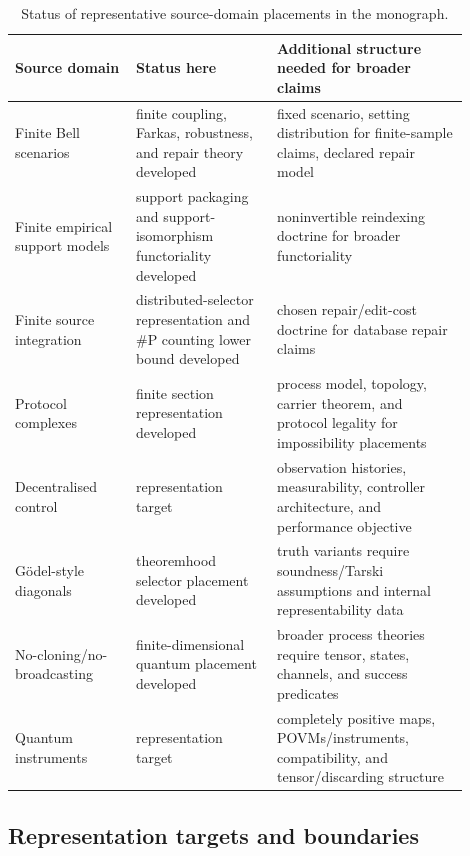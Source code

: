 \documentclass[11pt]{article}
\theoremstyle{plain}
\theoremstyle{definition}
\theoremstyle{remark}
\begin{document}
\begin{table}[htbp]
\centering
\caption{Status of representative source-domain placements in the monograph.}
\label{tab:source-domain-status}
\begin{tabular}{@{}p{0.24\linewidth}p{0.28\linewidth}p{0.38\linewidth}@{}}
\toprule
Source domain & Status here & Additional structure needed for broader claims\\
\midrule
Finite Bell scenarios & finite coupling, Farkas, robustness, and repair theory developed & fixed scenario, setting distribution for finite-sample claims, declared repair model\\
Finite empirical support models & support packaging and support-isomorphism functoriality developed & noninvertible reindexing doctrine for broader functoriality\\
Finite source integration & distributed-selector representation and $\#\mathrm P$ counting lower bound developed & chosen repair/edit-cost doctrine for database repair claims\\
Protocol complexes & finite section representation developed & process model, topology, carrier theorem, and protocol legality for impossibility placements\\
Decentralised control & representation target & observation histories, measurability, controller architecture, and performance objective\\
Gödel-style diagonals & theoremhood selector placement developed & truth variants require soundness/Tarski assumptions and internal representability data\\
No-cloning/no-broadcasting & finite-dimensional quantum placement developed & broader process theories require tensor, states, channels, and success predicates\\
Quantum instruments & representation target & completely positive maps, POVMs/instruments, compatibility, and tensor/discarding structure\\
\bottomrule
\end{tabular}
\end{table}

\subsection{Representation targets and boundaries}
\end{document}
